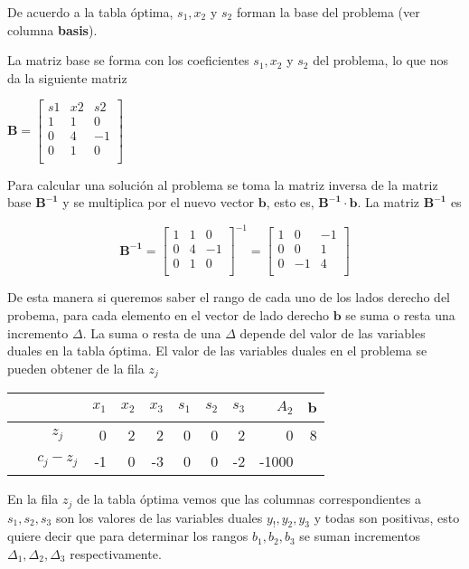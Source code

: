 \begin{solution}
  De acuerdo a la tabla óptima, $s_1, x_2$ y $s_2$ forman la base del problema (ver columna \textbf{basis}). 

  La matriz base se forma con los coeficientes $s_1, x_2$ y $s_2$ del problema, lo que nos da la siguiente matriz

  $\boldsymbol{B} = %
  \begin{bmatrix}
    s1& x2& s2\\
    1& 1& 0\\
    0& 4& -1\\
    0& 1& 0\\
  \end{bmatrix}
  $  

  Para calcular una solución al problema se toma la matriz inversa de la matriz base $\boldsymbol{B^{-1}}$ y se multiplica por el nuevo vector $\boldsymbol{b}$, esto es, $\boldsymbol{B^{-1}}\cdot \boldsymbol{b}$. La matriz $\boldsymbol{B^{-1}}$ es

  \[ \boldsymbol{B^{-1}} =%
    \begin{bmatrix}
    1& 1& 0\\
    0& 4& -1\\
    0& 1& 0\\
  \end{bmatrix}^{-1} =%
    \begin{bmatrix}
      1& 0& -1\\
      0& 0& 1\\
      0& -1& 4\\
    \end{bmatrix}
  \]

  
  De esta manera si queremos saber el rango de cada uno de los lados derecho del probema, para cada elemento en el vector de lado derecho $\boldsymbol{b}$ se suma o resta una incremento $\Delta$. La suma o resta de una $\Delta$ depende del valor de las variables duales en la tabla óptima. El valor
  de las variables duales en el problema se pueden obtener de la fila $z_j$

  {    \centering
    \begin{tabular}{lcrrrrrrrr}
      ~ & ~ & $x_1$ & $x_2$ & $x_3$ & $s_1$ & $s_2$ & $s_3$ & $A_2$ & $\boldsymbol{b}$ \\ \midrule
\toprule
          ~ & $z_j$ & 0 & 2 & 2 & \cellcolor{yellow}0 & \cellcolor{yellow}0 & \cellcolor{yellow}2 & 0 & \cellcolor{green}8 \\ 
      ~ & $c_j - z_j$ & -1 & 0 & -3 & 0 & 0 & -2 & -1000 \\ \toprule
    \end{tabular}\par}

  En la fila $z_j$ de la tabla óptima vemos que las columnas correspondientes a $s_1, s_2, s_3$ son los valores de las variables duales $y_!, y_2, y_3$ y todas son positivas, esto quiere decir que para determinar los rangos $b_1, b_2, b_3$ se suman incrementos $\Delta_1, \Delta_2, \Delta_3$ respectivamente.
 
\end{solution}



